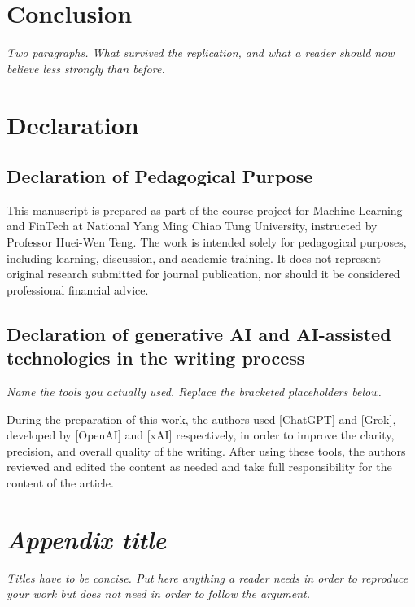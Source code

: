 \documentclass[12pt]{article}
\newcommand{\inst}[1]{\textit{#1}}
\begin{document}
\section{Conclusion}

\inst{Two paragraphs. What survived the replication, and what a reader should now
believe less strongly than before.}


\section*{Declaration}

\subsection*{Declaration of Pedagogical Purpose}

This manuscript is prepared as part of the course project for Machine Learning and
FinTech at National Yang Ming Chiao Tung University, instructed by Professor
Huei-Wen Teng. The work is intended solely for pedagogical purposes, including
learning, discussion, and academic training. It does not represent original research
submitted for journal publication, nor should it be considered professional financial
advice.

\subsection*{Declaration of generative AI and AI-assisted technologies in the writing process}

\inst{Name the tools you actually used. Replace the bracketed placeholders below.}

During the preparation of this work, the authors used [ChatGPT] and [Grok], developed
by [OpenAI] and [xAI] respectively, in order to improve the clarity, precision, and
overall quality of the writing. After using these tools, the authors reviewed and
edited the content as needed and take full responsibility for the content of the
article.






\appendix

\section{\inst{Appendix title}}

\inst{Titles have to be concise. Put here anything a reader needs in order to
reproduce your work but does not need in order to follow the argument.}
\end{document}

